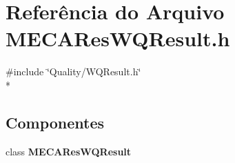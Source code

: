 \section{Referência do Arquivo M\+E\+C\+A\+Res\+W\+Q\+Result.\+h}
\label{_m_e_c_a_res_w_q_result_8h}
{\ttfamily \#include \char`\"{}Quality/\+W\+Q\+Result.\+h\char`\"{}}\\*
\subsection*{Componentes}
\begin{DoxyCompactItemize}
\item 
class {\bf M\+E\+C\+A\+Res\+W\+Q\+Result}
\end{DoxyCompactItemize}
